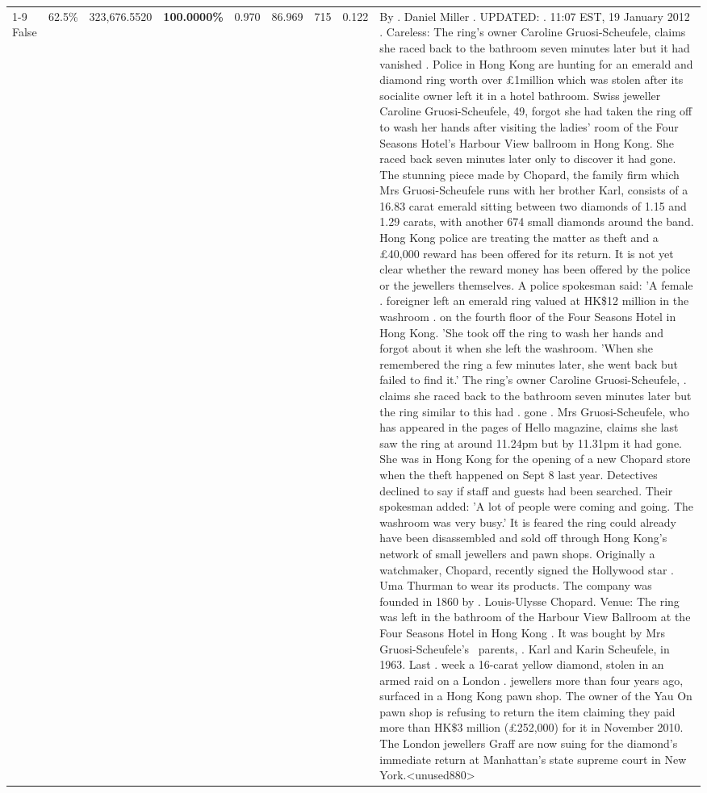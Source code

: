 \begin{table}[H]
\begin{tabular}{lllrlllll}
\cline{1-9} \cline{2-9}
False & 62.5\% & 323,676.5520 & \bfseries \color{red} 100.0000\% & 0.970 & 86.969 & 715 & 0.122 & By . Daniel Miller . UPDATED: . 11:07 EST, 19 January 2012 . Careless: The ring's owner Caroline Gruosi-Scheufele, claims she raced back to the bathroom seven minutes later but it had vanished . Police in Hong Kong are hunting for an emerald and diamond ring worth over £1million which was stolen after its socialite owner left it in a hotel bathroom. Swiss jeweller Caroline Gruosi-Scheufele, 49, forgot she had taken the ring off to wash her hands after visiting the ladies' room of the Four Seasons Hotel's Harbour View ballroom in Hong Kong. She raced back seven minutes later only to discover it had gone. The stunning piece made by Chopard, the family firm which Mrs Gruosi-Scheufele runs with her brother Karl, consists of a 16.83 carat emerald sitting between two diamonds of 1.15 and 1.29 carats, with another 674 small diamonds around the band. Hong Kong police are treating the matter as theft and a £40,000 reward has been offered for its return. It is not yet clear whether the reward money has been offered by the police or the jewellers themselves. A police spokesman said: 'A female . foreigner left an emerald ring valued at HK\$12 million in the washroom . on the fourth floor of the Four Seasons Hotel in Hong Kong. 'She took off the ring to wash her hands and forgot about it when she left the washroom. 'When she remembered the ring a few minutes later, she went back but failed to find it.' The ring's owner Caroline Gruosi-Scheufele, . claims she raced back to the bathroom seven minutes later but the ring similar to this had . gone . Mrs Gruosi-Scheufele, who has appeared in the pages of Hello magazine, claims she last saw the ring at around 11.24pm but by 11.31pm it had gone. She was in Hong Kong for the opening of a new Chopard store when the theft happened on Sept 8 last year. Detectives declined to say if staff and guests had been searched. Their spokesman added: 'A lot of people were coming and going. The washroom was very busy.' It is feared the ring could already have been disassembled and sold off through Hong Kong's network of small jewellers and pawn shops. Originally a watchmaker, Chopard, recently signed the Hollywood star . Uma Thurman to wear its products. The company was founded in 1860 by . Louis-Ulysse Chopard. Venue: The ring was left in the bathroom of the Harbour View Ballroom at the Four Seasons Hotel in Hong Kong . It was bought by Mrs Gruosi-Scheufele's  parents, . Karl and Karin Scheufele, in 1963. Last . week a 16-carat yellow diamond, stolen in an armed raid on a London . jewellers more than four years ago, surfaced in a Hong Kong pawn shop. The owner of the Yau On pawn shop is refusing to return the item claiming they paid more than HK\$3 million (£252,000) for it in November 2010. The London jewellers Graff are now suing for the diamond’s immediate return at Manhattan’s state supreme court in New York.<unused880> \\

\end{tabular}
\end{table}
